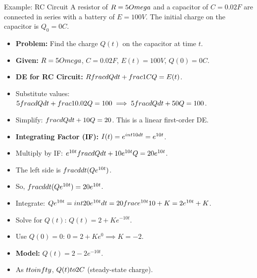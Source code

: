 \documentclass[10pt,aspectratio=169]{beamer}
\begin{document}
\begin{frame}{Example: RC Circuit}
    A resistor of $R=5 \\Omega$ and a capacitor of $C=0.02 F$ are connected in series with a battery of $E=100 V$. The initial charge on the capacitor is $Q_0 = 0 C$.
    \begin{itemize}
        \item \textbf{Problem:} Find the charge $Q(t)$ on the capacitor at time $t$.
        \item \textbf{Given:} $R=5 \\Omega$, $C=0.02 F$, $E(t)=100 V$, $Q(0)=0 C$.
        \item \textbf{DE for RC Circuit:} $R\\frac{dQ}{dt} + \\frac{1}{C}Q = E(t)$.
        \item Substitute values: $5\\frac{dQ}{dt} + \\frac{1}{0.02}Q = 100 \implies 5\\frac{dQ}{dt} + 50Q = 100$.
        \item Simplify: $\\frac{dQ}{dt} + 10Q = 20$. This is a linear first-order DE.
        \item \textbf{Integrating Factor (IF):} $I(t) = e^{\\int 10 dt} = e^{10t}$.
        \item Multiply by IF: $e^{10t}\\frac{dQ}{dt} + 10e^{10t}Q = 20e^{10t}$.
        \item The left side is $\\frac{d}{dt}(Qe^{10t})$.
        \item So, $\\frac{d}{dt}(Qe^{10t}) = 20e^{10t}$.
        \item Integrate: $Qe^{10t} = \\int 20e^{10t} dt = 20 \\frac{e^{10t}}{10} + K = 2e^{10t} + K$.
        \item Solve for $Q(t)$: $Q(t) = 2 + Ke^{-10t}$.
        \item Use $Q(0)=0$: $0 = 2 + Ke^0 \implies K = -2$.
        \item \textbf{Model:} $Q(t) = 2 - 2e^{-10t}$.
        \item As $t \\to \\infty$, $Q(t) \\to 2 C$ (steady-state charge).
    \end{itemize}
\end{frame}
\end{document}
